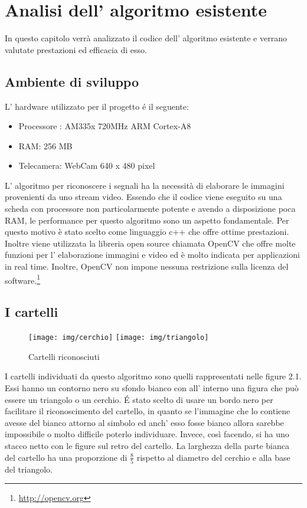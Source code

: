 \chapter{Analisi dell' algoritmo esistente}

In questo capitolo verrà analizzato il codice dell' algoritmo esistente e verrano valutate prestazioni ed efficacia di esso.


\section{Ambiente di sviluppo}

	L' hardware utilizzato per il progetto \'e il seguente:
	\begin{itemize}
	\item Processore : AM335x 720MHz ARM Cortex-A8
	\item RAM: 256 MB
	\item Telecamera: WebCam 640 x 480 pixel
	\end{itemize}

	L' algoritmo per riconoscere i segnali ha la necessità di elaborare le immagini provenienti da uno stream video. Essendo che il codice viene eseguito su una scheda con processore non particolarmente potente e avendo a disposizione poca RAM, le performance per questo algoritmo sono un aspetto fondamentale. Per questo motivo è stato scelto come linguaggio c++ che offre ottime prestazioni. Inoltre viene utilizzata la libreria open source chiamata OpenCV che offre molte funzioni per l' elaborazione immagini e video ed è molto indicata per applicazioni in real time. Inoltre, OpenCV non impone nessuna restrizione sulla licenza del software.\footnote{\url{http://opencv.org}}

\section{I cartelli}
	\begin{figure}[!ht]
		\centering
		\texttt{[image: img/cerchio]}
		\texttt{[image: img/triangolo]}
		\caption{Cartelli riconosciuti}
	\end{figure}
	I cartelli individuati da questo algoritmo sono quelli rappresentati nelle figure 2.1. Essi hanno un contorno nero su sfondo bianco con all' interno una figura che può essere un triangolo o un cerchio. \'E stato scelto di usare un bordo nero per facilitare il riconoscimento del cartello, in quanto se l'immagine che lo contiene avesse del bianco attorno al simbolo ed anch' esso fosse bianco allora sarebbe impossibile o molto difficile poterlo individuare. Invece, così facendo, si ha uno stacco netto con le figure sul retro del cartello. La larghezza della parte bianca del cartello ha una proporzione di $\tfrac{8}{5}$ rispetto al diametro del cerchio e alla base del triangolo.

